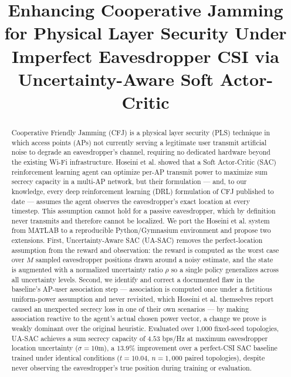 \documentclass[conference]{IEEEtran}
\begin{document}
\title{Enhancing Cooperative Jamming for Physical Layer Security Under Imperfect Eavesdropper CSI via Uncertainty-Aware Soft Actor-Critic}

\author{
}

\maketitle

\begin{abstract}
Cooperative Friendly Jamming (CFJ) is a physical layer security (PLS) technique in which access points (APs) not currently serving a legitimate user transmit artificial noise to degrade an eavesdropper's channel, requiring no dedicated hardware beyond the existing Wi-Fi infrastructure. Hoseini et al. showed that a Soft Actor-Critic (SAC) reinforcement learning agent can optimize per-AP transmit power to maximize sum secrecy capacity in a multi-AP network, but their formulation --- and, to our knowledge, every deep reinforcement learning (DRL) formulation of CFJ published to date --- assumes the agent observes the eavesdropper's exact location at every timestep. This assumption cannot hold for a passive eavesdropper, which by definition never transmits and therefore cannot be localized. We port the Hoseini et al. system from MATLAB to a reproducible Python/Gymnasium environment and propose two extensions. First, Uncertainty-Aware SAC (UA-SAC) removes the perfect-location assumption from the reward and observation: the reward is computed as the worst case over $M$ sampled eavesdropper positions drawn around a noisy estimate, and the state is augmented with a normalized uncertainty ratio $\rho$ so a single policy generalizes across all uncertainty levels. Second, we identify and correct a documented flaw in the baseline's AP-user association step --- association is computed once under a fictitious uniform-power assumption and never revisited, which Hoseini et al. themselves report caused an unexpected secrecy loss in one of their own scenarios --- by making association reactive to the agent's actual chosen power vector, a change we prove is weakly dominant over the original heuristic. Evaluated over 1{,}000 fixed-seed topologies, UA-SAC achieves a sum secrecy capacity of $4.53$ bps/Hz at maximum eavesdropper location uncertainty ($\sigma=10$m), a $13.9\%$ improvement over a perfect-CSI SAC baseline trained under identical conditions ($t=10.04$, $n=1{,}000$ paired topologies), despite never observing the eavesdropper's true position during training or evaluation.
\end{abstract}
\end{document}
